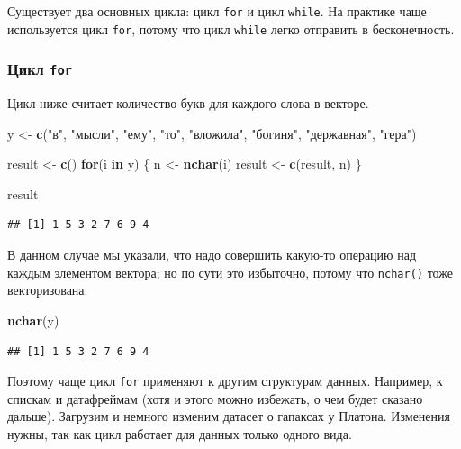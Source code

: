 \documentclass[
]{book}
\newenvironment{Shaded}{\begin{snugshade}}{\end{snugshade}}
\newcommand{\ControlFlowTok}[1]{\textcolor[rgb]{0.13,0.29,0.53}{\textbf{#1}}}
\newcommand{\FunctionTok}[1]{\textcolor[rgb]{0.13,0.29,0.53}{\textbf{#1}}}
\newcommand{\NormalTok}[1]{#1}
\newcommand{\OtherTok}[1]{\textcolor[rgb]{0.56,0.35,0.01}{#1}}
\newcommand{\StringTok}[1]{\textcolor[rgb]{0.31,0.60,0.02}{#1}}
\theoremstyle{definition}
\theoremstyle{definition}
\theoremstyle{definition}
\theoremstyle{definition}
\theoremstyle{remark}
\begin{document}
Существует два основных цикла: цикл \texttt{for} и цикл \texttt{while}. На практике чаще используется цикл \texttt{for}, потому что цикл \texttt{while} легко отправить в бесконечность.

\hypertarget{ux446ux438ux43aux43b-for}{%
\subsubsection{\texorpdfstring{Цикл \texttt{for}}{Цикл for}}\label{ux446ux438ux43aux43b-for}}

Цикл ниже считает количество букв для каждого слова в векторе.

\begin{Shaded}
\begin{Highlighting}[]
\NormalTok{y }\OtherTok{\textless{}{-}} \FunctionTok{c}\NormalTok{(}\StringTok{"в"}\NormalTok{, }\StringTok{"мысли"}\NormalTok{, }\StringTok{"ему"}\NormalTok{, }\StringTok{"то"}\NormalTok{, }\StringTok{"вложила"}\NormalTok{, }\StringTok{"богиня"}\NormalTok{, }\StringTok{"державная"}\NormalTok{, }\StringTok{"гера"}\NormalTok{)}

\NormalTok{result }\OtherTok{\textless{}{-}} \FunctionTok{c}\NormalTok{()}
\ControlFlowTok{for}\NormalTok{(i }\ControlFlowTok{in}\NormalTok{ y) \{ }
\NormalTok{  n }\OtherTok{\textless{}{-}} \FunctionTok{nchar}\NormalTok{(i)}
\NormalTok{  result }\OtherTok{\textless{}{-}} \FunctionTok{c}\NormalTok{(result, n)}
\NormalTok{\}}

\NormalTok{result}
\end{Highlighting}
\end{Shaded}

\begin{verbatim}
## [1] 1 5 3 2 7 6 9 4
\end{verbatim}

В данном случае мы указали, что надо совершить какую-то операцию над каждым элементом вектора; но по сути это избыточно, потому что \texttt{nchar()} тоже векторизована.

\begin{Shaded}
\begin{Highlighting}[]
\FunctionTok{nchar}\NormalTok{(y)}
\end{Highlighting}
\end{Shaded}

\begin{verbatim}
## [1] 1 5 3 2 7 6 9 4
\end{verbatim}

Поэтому чаще цикл \texttt{for} применяют к другим структурам данных. Например, к спискам и датафреймам (хотя и этого можно избежать, о чем будет сказано дальше). Загрузим и немного изменим датасет о гапаксах у Платона. Изменения нужны, так как цикл работает для данных только одного вида.
\end{document}
